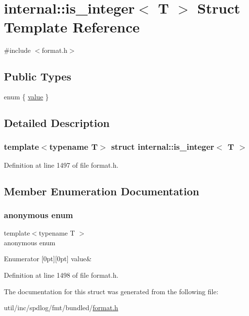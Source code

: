 \hypertarget{structinternal_1_1is__integer}{}\section{internal\+:\+:is\+\_\+integer$<$ T $>$ Struct Template Reference}
\label{structinternal_1_1is__integer}


{\ttfamily \#include $<$format.\+h$>$}

\subsection*{Public Types}
\begin{DoxyCompactItemize}
\item 
enum \{ \hyperlink{structinternal_1_1is__integer_a2e7e4cc0fd85c04cd91fb436d179bdd6a13921d89f887ba86d4937a1537486786}{value}
 \}
\end{DoxyCompactItemize}


\subsection{Detailed Description}
\subsubsection*{template$<$typename T$>$\newline
struct internal\+::is\+\_\+integer$<$ T $>$}



Definition at line 1497 of file format.\+h.



\subsection{Member Enumeration Documentation}
\mbox{\label{structinternal_1_1is__integer_a2e7e4cc0fd85c04cd91fb436d179bdd6}} 
\subsubsection{\texorpdfstring{anonymous enum}{anonymous enum}}
{\footnotesize\ttfamily template$<$typename T $>$ \\
anonymous enum}

\begin{DoxyEnumFields}{Enumerator}
[0pt][0pt]{}\mbox{\label{structinternal_1_1is__integer_a2e7e4cc0fd85c04cd91fb436d179bdd6a13921d89f887ba86d4937a1537486786}} 
value&\\
\hline

\end{DoxyEnumFields}


Definition at line 1498 of file format.\+h.



The documentation for this struct was generated from the following file\+:\begin{DoxyCompactItemize}
\item 
util/inc/spdlog/fmt/bundled/\hyperlink{format_8h}{format.\+h}\end{DoxyCompactItemize}
